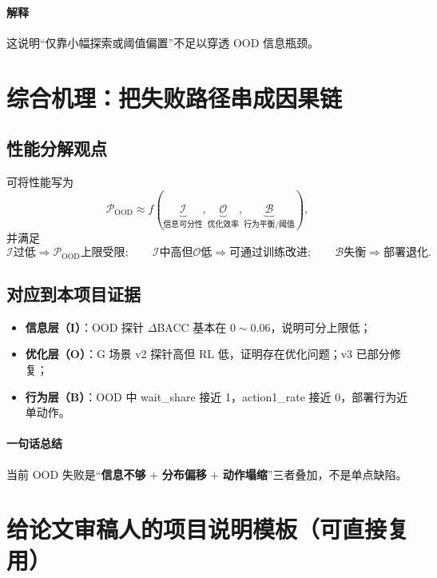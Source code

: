 ﻿\documentclass[11pt,a4paper]{ctexart}
\begin{document}
\paragraph{解释}
这说明“仅靠小幅探索或阈值偏置”不足以穿透 OOD 信息瓶颈。

\section{综合机理：把失败路径串成因果链}
\subsection{性能分解观点}
可将性能写为
\begin{equation}
\mathcal{P}_{\text{OOD}}
\approx
f(\underbrace{\mathcal{I}}_{\text{信息可分性}},
\underbrace{\mathcal{O}}_{\text{优化效率}},
\underbrace{\mathcal{B}}_{\text{行为平衡/阈值}}),
\end{equation}
并满足
\begin{equation}
\mathcal{I}\text{过低}\Rightarrow
\mathcal{P}_{\text{OOD}}\text{上限受限};
\qquad
\mathcal{I}\text{中高但}\mathcal{O}\text{低}\Rightarrow\text{可通过训练改进};
\qquad
\mathcal{B}\text{失衡}\Rightarrow\text{部署退化}.
\end{equation}

\subsection{对应到本项目证据}
\begin{itemize}
  \item \textbf{信息层（I）}：OOD 探针 $\Delta$BACC 基本在 $0\sim0.06$，说明可分上限低；
  \item \textbf{优化层（O）}：G 场景 v2 探针高但 RL 低，证明存在优化问题；v3 已部分修复；
  \item \textbf{行为层（B）}：OOD 中 wait\_share 接近 1，action1\_rate 接近 0，部署行为近单动作。
\end{itemize}

\paragraph{一句话总结}
当前 OOD 失败是“\textbf{信息不够} + \textbf{分布偏移} + \textbf{动作塌缩}”三者叠加，不是单点缺陷。

\section{给论文审稿人的项目说明模板（可直接复用）}
\end{document}

